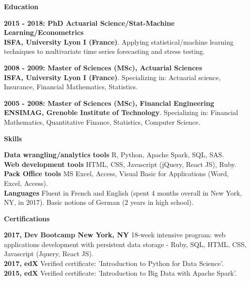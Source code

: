\documentclass[a4paper,12pt,final]{memoir}
\newcommand{\SmallSep}{\vspace{0.5em}}
\newcommand{\CVSection}[1]
	{\Large\textbf{#1}\par
	\SmallSep\normalsize\normalfont}
\newcommand{\CVItem}[1]
	{\textbf{\color{Blue} #1}}
\begin{document}
\SmallSep

\CVSection{Education}
\CVItem{2015 - 2018: PhD Actuarial Science/Stat-Machine Learning/Econometrics}\\
\textbf{ISFA, University Lyon I (France)}. Applying statistical/machine learning techniques to multivariate time series forecasting and stress testing.

\SmallSep

\CVItem{2008 - 2009: Master of Sciences (MSc), Actuarial Sciences}\\
\textbf{ISFA, University Lyon I (France)}. Specializing in: Actuarial science, Insurance, Financial Mathematics, Statistics.  
\SmallSep

\CVItem{2005 - 2008: Master of Sciences (MSc), Financial Engineering}\\
\textbf{ENSIMAG, Grenoble Institute of Technology}. Specializing in: Financial Mathematics, Quantitative Finance, Statistics, Computer Science.

\SmallSep

\CVSection{Skills}

\CVItem{Data wrangling/analytics tools}
R, Python, Apache Spark, SQL, SAS.\\
\CVItem{Web development tools}
HTML, CSS, Javascript (jQuery, React JS), Ruby.\\
\CVItem{Pack Office tools}
MS Excel, Access, Visual Basic for Applications (Word, Excel, Access).\\
\CVItem{Languages}
Fluent in French and English (spent 4 months overall in New York, NY, in 2017). Basic notions of German (2 years in high school). 

\SmallSep

\CVSection{Certifications}

\CVItem{2017, Dev Bootcamp New York, NY}
18-week intensive program: web applications development with persistent data storage - Ruby, SQL, HTML, CSS, Javascript (Jquery, React JS). 
\\
\CVItem{2017, edX}
Verified certificate: 'Introduction to Python for Data Science'. 
\\
\CVItem{2015, edX}
Verified certificate: 'Introduction to Big Data with Apache Spark'.

\SmallSep


\end{document}
